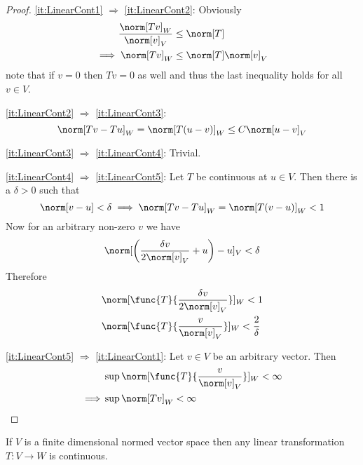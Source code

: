 \begin{proof}
    \cref{it:LinearCont1} \(\Rightarrow\) \cref{it:LinearCont2}: Obviously
    \begin{align*}
        \dfrac{\norm[Tv]_W}{\norm[v]_V} & \leq \norm[T]            \\
        \implies \norm[Tv]_W            & \leq \norm[T] \norm[v]_V
    \end{align*}
    note that if \(v = 0\) then \(Tv = 0\) as well and thus the last inequality holds for all \(v \in V\).

    \cref{it:LinearCont2} \(\Rightarrow\) \cref{it:LinearCont3}:
    \begin{equation*}
        \norm[Tv - Tu]_W = \norm[T(u - v)]_W \leq C \norm[u - v]_V
    \end{equation*}

    \cref{it:LinearCont3} \(\Rightarrow\) \cref{it:LinearCont4}: Trivial.

    \cref{it:LinearCont4} \(\Rightarrow\) \cref{it:LinearCont5}: Let \(T\) be continuous at \(u \in V\). Then there is  a \(\delta > 0 \) such that
    \begin{equation*}
        \norm[v-u] < \delta \implies \norm[Tv - Tu]_W = \norm[T(v-u)]_W < 1
    \end{equation*}
    Now for an arbitrary non-zero \(v\) we have
    \begin{equation*}
        \norm[\left( \dfrac{\delta v}{2\norm[v]_V} + u \right) - u]_V < \delta
    \end{equation*}
    Therefore
    \begin{align*}
         & \norm[\func{T}{\dfrac{\delta v}{2\norm[v]_V}}]_W  < 1         \\
         & \norm[\func{T}{\dfrac{v}{\norm[v]_V}}]_W  < \dfrac{2}{\delta}
    \end{align*}

    \cref{it:LinearCont5} \(\Rightarrow\) \cref{it:LinearCont1}: Let \(v \in V\) be an arbitrary vector. Then
    \begin{align*}
                 & \sup \norm[\func{T}{\dfrac{v}{\norm[v]_V}}]_W < \infty \\
        \implies & \sup \norm[Tv]_W < \infty
    \end{align*}

\end{proof}




\begin{theorem}
    If \(V\) is a finite dimensional normed vector space then any linear transformation \(T : V \to W\) is continuous.
\end{theorem}

